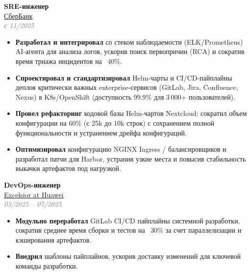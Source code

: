\documentclass[10pt, a4paper]{article}
\begin{document}
\begin{minipage}[t]{0.55\textwidth}

\raggedright


\hspace{0.5cm}
\begin{minipage}[t]{0.9\textwidth}
  \raggedright
  \textbf{\Large SRE-инженер} \\[2pt]
  \textcolor{graytext}{\href{https://www.sberbank.ru/ru/person}{СберБанк}}\extlink \\
  \textcolor{graytext}{\textit{с 11/2025}}
  \begin{itemize}
      \item \textbf{Разработал и интегрировал} со стеком наблюдаемости (ELK/Prometheus) AI-агента для анализа логов, ускорив поиск первопричин (RCA) и сократив время триажа инцидентов на ~40\%.
      \item \textbf{Спроектировал и стандартизировал} Helm-чарты и CI/CD-пайплайны деплоя критически важных enterprise-сервисов (GitLab, Jira, Confluence, Nexus) в K8s/OpenShift (доступность 99.9\% для 3\,000+ пользователей).
      \item \textbf{Провел рефакторинг} кодовой базы Helm-чартов Nextcloud: сократил объем конфигурации на 60\% (с 25k до 10k строк) с сохранением полной функциональности и устранением дрейфа конфигураций.
      \item \textbf{Оптимизировал} конфигурацию NGINX Ingress / балансировщиков и разработал патчи для Harbor, устранив узкие места и повысив стабильность выкачки артефактов под нагрузкой.
  \end{itemize}
\end{minipage}

\vspace{0.7cm}

\hspace{0.5cm}
\begin{minipage}[t]{0.9\textwidth}
    \raggedright
    \textbf{\Large DevOps-инженер} \\[2pt]
    \textcolor{graytext}{\href{https://rnew.tilda.ws/excelsiorathuawei}{Excelsior at Huawei}}\extlink \\
    \textcolor{graytext}{\textit{03/2025 -- 07/2025}}
    \begin{itemize}
        \item \textbf{Модульно переработал} GitLab CI/CD пайплайны системной разработки, сократив среднее время сборки и тестов на ~30\% за счет параллелизации и кэширования артефактов.
        \item \textbf{Внедрил} шаблоны пайплайнов, ускорив доставку изменений для ключевой команды разработки.
    \end{itemize}
\end{minipage}


\end{minipage}
\end{document}
